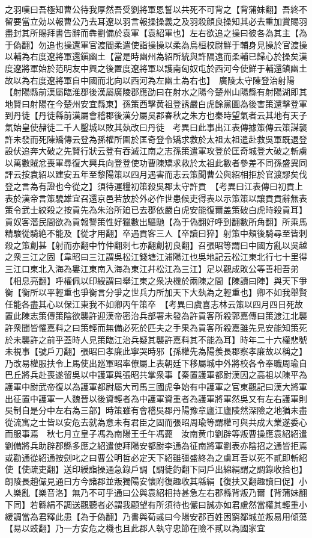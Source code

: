 之羽嘆曰吾極知曹公待我厚然吾受劉將軍恩誓以共死不可背之【背蒲妹翻】吾終不留要當立効以報曹公乃去耳遼以羽言報操操義之及羽殺顔良操知其必去重加賞賜羽盡封其所賜拜書告辭而犇劉備於袁軍【袁紹軍也】左右欲追之操曰彼各為其主【為于偽翻】勿追也操還軍官渡閻柔遣使詣操操以柔為烏桓校尉鮮于輔身見操於官渡操以輔為右度遼將軍還鎭幽土【當是時幽州為紹所統與許隔遠而柔輔已歸心於操矣漢度遼將軍始於范明友中興之後置度遼將軍以護南匈奴屯於西河今使鮮于輔還鎮幽土故以為右度遼將軍自中國而北向以西河為左幽土為右也】　廣陵太守陳登治射陽【射陽縣前漢屬臨淮郡後漢屬廣陵郡應劭曰在射水之陽今楚州山陽縣有射陽湖即其地賢曰射陽在今楚州安宜縣東】孫策西擊黄祖登誘嚴白虎餘黨圖為後害策還擊登軍到丹徒【丹徒縣前漢屬會稽郡後漢分屬吳郡春秋之朱方也秦時望氣者云其地有天子氣始皇使赭徒二千人鑿城以敗其埶改曰丹徒　考異曰此事出江表傳據策傳云策謀襲許未發而死陳矯傳云登為孫權所圍於匡奇登令矯求救於太祖太祖遣赴救吳軍既退登設伏追奔大破之先賢行狀云登有吞滅江南之志孫策遣軍攻登於匡奇城登大破之斬虜以萬數賊忿喪軍尋復大興兵向登登使功曹陳矯求救於太祖此數者參差不同孫盛異同評云按袁紹以建安五年至黎陽策以四月遇害而志云策聞曹公與紹相拒於官渡謬矣伐登之言為有證也今從之】須待運糧初策殺吳郡太守許貢　【考異曰江表傳曰初貢上表於漢帝言策驍雄宜召還京邑若放於外必作世患候吏得表以示策策以讓貢貢辭無表策令武士絞殺之按貢先為朱治所廹已去郡依嚴白虎安能復爾盖策破白虎時殺貢耳】貢奴客濳民間欲為貢報讐策性好獵數出驅馳【為于偽翻好呼到翻數所角翻】所乘馬精駿從騎絶不能及【從才用翻】卒遇貢客三人【卒讀曰猝】射策中頰後騎尋至皆刺殺之策創甚【射而亦翻中竹仲翻刺七亦翻創初良翻】召張昭等謂曰中國方亂以吳越之衆三江之固【韋昭曰三江謂吳松江錢塘江浦陽江也吳地記云松江東北行七十里得三江口東北入海為婁江東南入海為東江幷松江為三江】足以觀成敗公等善相吾弟【相息亮翻】呼權佩以印綬謂曰舉江東之衆决機於兩陳之間【陳讀曰陣】與天下爭衡【衡所以平輕重也爭衡言分爭之世兵力所加天下大埶為之輕重也】卿不如我舉賢任能各盡其心以保江東我不如卿丙午策卒　【考異曰虞喜志林云策以四月四日死故置此陳志策傳策陰欲襲許迎漢帝密治兵部署未發為許貢客所殺郭嘉傳曰策渡江北襲許衆聞皆懼嘉料之曰策輕而無備必死於匹夫之手果為貢客所殺嘉雖先見安能知策死於未襲許之前乎蓋時人見策臨江治兵疑其襲許嘉料其不能為耳】時年二十六權悲號未視事【號戶刀翻】張昭曰孝廉此寧哭時邪【孫權先為陽羨長郡察孝廉故以稱之】乃改易權服扶令上馬使出廵軍昭率僚屬上表朝廷下移屬城中外將校各令奉職周瑜自巴丘將兵赴喪遂留吳以中護軍與張昭共掌衆事【秦置護軍都尉漢因之高祖以陳平為護軍中尉武帝復以為護軍都尉屬大司馬三國虎争始有中護軍之官東觀記曰漢大將軍出征置中護軍一人魏晉以後資輕者為中護軍資重者為護軍將軍然吳又有左右護軍則吳制自是分中左右為三部】時策雖有會稽吳郡丹陽豫章廬江廬陵然深險之地猶未盡從流寓之士皆以安危去就為意未有君臣之固而張昭周瑜等謂權可與共成大業遂委心而服事焉　秋七月立皇子馮為南陽王壬午馮薨　汝南黄巾劉辟等叛曹操應袁紹紹遣劉備將兵助辟郡縣多應之紹遣使拜陽安都尉李通為征南將軍劉表亦陰招之通皆拒焉或勸通從紹通按劍叱之曰曹公明哲必定天下紹雖彊盛終為之虜耳吾以死不貳即斬紹使【使疏吏翻】送印綬詣操通急錄戶調【調徒釣翻下同戶出綿絹謂之調錄收拾也】朗陵長趙儼見通曰方今諸郡並叛獨陽安懷附復趣收其緜絹【復扶又翻趣讀曰促】小人樂亂【樂音洛】無乃不可乎通曰公與袁紹相持甚急左右郡縣背叛乃爾【背蒲妹翻下同】若緜絹不調送觀聽者必謂我顧望有所須待也儼曰誠亦如君慮然當權其輕重小緩調當為君釋此患【為于偽翻】乃書與荀彧曰今陽安郡百姓困窮鄰城並叛易用傾蕩【易以豉翻】乃一方安危之機也且此郡人執守忠節在險不貳以為國家宜